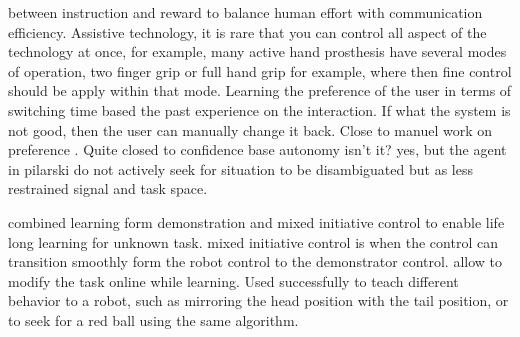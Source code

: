 \cite{pilarski2012between} between instruction and reward to balance human effort with communication efficiency. Assistive technology, it is rare that you can control all aspect of the technology at once, for example, many active hand prosthesis have several modes of operation, two finger grip or full hand grip for example, where then fine control should be apply within that mode. Learning the preference of the user in terms of switching time based the past experience on the interaction. If what the system is not good, then the user can manually change it back. Close to manuel work on preference \cite{Mason2011}. Quite closed to confidence base autonomy isn't it? \cite{chernova09jair} yes, but the agent in pilarski do not actively seek for situation to be disambiguated but as less restrained signal and task space.

\cite{grollman2007dogged} combined learning form demonstration and mixed initiative control to enable life long learning for unknown task. mixed initiative control is when the control can transition smoothly form the robot control to the demonstrator control. allow to modify the task online while learning. Used successfully to teach different behavior to a robot, such as mirroring the head position with the tail position, or to seek for a red ball using the same algorithm.


